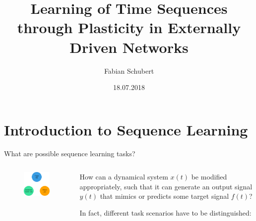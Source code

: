 \documentclass[8pt,aspectratio=169]{beamer}
\author{Fabian Schubert}
\title{Learning of Time Sequences through Plasticity in Externally Driven Networks}
\date{18.07.2018}
\begin{document}
\begin{frame}
\titlepage
\end{frame}

\begin{frame}
\tableofcontents
\end{frame}

\section{Introduction to Sequence Learning}
\begin{frame}[t]{What are possible sequence learning tasks?}

\begin{columns}[T]
\begin{column}{0.5\textwidth}
\begin{figure}
\includegraphics{./figures/sequ_learn_illustration_0.pdf}
\end{figure}
\end{column}
\begin{column}{0.5\textwidth}
How can a dynamical system $x(t)$ be modified appropriately, such that it can generate an output signal $y(t)$ that mimics or predicts some target signal $f(t)$?

In fact, different task scenarios have to be distinguished:

\end{column}
\end{columns}
\end{frame}
\end{document}
